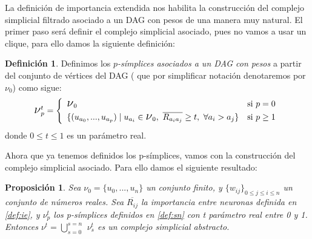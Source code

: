 \documentclass[12pt, a4paper, twoside]{book}
\numberwithin{equation}{section}
\theoremstyle{definition}
\newtheorem{defi}{Definición}[section]
\theoremstyle{remark}
\theoremstyle{plain}
\newtheorem{prop}{Proposición}
\begin{document}
	La definición de importancia extendida nos habilita la construcción 
	del complejo simplicial filtrado asociado a un DAG con pesos de una 
	manera muy natural. El primer paso será definir el complejo 
	simplicial asociado, pues no vamos a usar un clique, para ello damos 
	la siguiente definición: 
	\begin{defi}
		Definimos los \textit{$p$-símplices asociados a un DAG con pesos} a partir del conjunto de vértices del DAG ( que
		por simplificar notación denotaremos por {\Large $\nu$}$_{0}$) 
		como sigue:
	\begin{equation}
		\text{{\Large $\nu$}}_{p}^{t}=
		\left \{
			\begin{array}{ll}
				\text{{\Large $\nu$}}_{0} & \text{si } p=0\\[3pt]
				\{(u_{a_{0}},...,u_{a_{p}}) \mid u_{a_{i}} \in 
					\text{{\Large $\nu$}}_{0},\ 
					\overline{R_{a_{i}a_{j}}} \geq t,\ 
				\forall a_{i} > a_{j} \} & \text{si } p \geq 1
			\end{array}
		\right.  
		\label{def:sn}
	\end{equation}
	donde $0 \leq t \leq 1$ es un parámetro real.
	\end{defi}
	Ahora que ya tenemos definidos los p-símplices, vamos con la 
	construcción del complejo simplicial asociado. Para ello damos el 
	siguiente resultado:
	\begin{prop}
		Sea {\Large $\nu$}$_{0}=\{u_{0},...,u_{n}\}$ un conjunto 
		finito, y $\{w_{ij}\}_{0\leq j \leq i \leq n}$ un 
		conjunto de números reales. Sea $\overline{R_{ij}}$ la 
		importancia entre neuronas definida en \ref{def:ie}, y 
		{\Large $\nu$}$_{p}^{t}$ los p-símplices definidos en 
		\ref{def:sn} con t parámetro real entre 0 y 1. Entonces 
		{\Large $\nu$}$^{t}=\bigcup_{s=0}^{s=n}$
		{\Large $\nu$}$_{s}^{t}$ 
		es un complejo simplicial abstracto. 
		\label{prop:cs}
	\end{prop}
\end{document}
